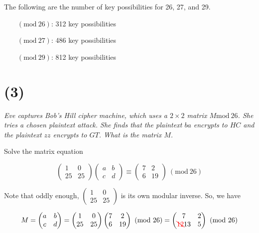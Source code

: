 \documentclass[12pt]{article}
\renewcommand{\mod}[1]{\mathrm{mod}\ #1}
\renewcommand{\pmod}[1]{\ (\mod{#1})}
\begin{document}
    The following are the number of key possibilities for 26, 27, and 29.

    \begin{itemize}
      \item[$\pmod{26}$:] 312 key possibilities
      \item[$\pmod{27}$:] 486 key possibilities
      \item[$\pmod{29}$:] 812 key possibilities
    \end{itemize}

\section*{(3)} \textit{Eve captures Bob’s Hill cipher machine, which uses a $2\times2$ matrix $M \mod{26}$. She tries a chosen plaintext attack. She finds that the plaintext $ba$ encrypts to $HC$ and the plaintext $zz$ encrypts to $GT$. What is the matrix $M$.}

    Solve the matrix equation

    $$\begin{pmatrix}1 & 0\\25 & 25\end{pmatrix}\begin{pmatrix}a & b\\c & d\end{pmatrix} \equiv \begin{pmatrix}7 & 2\\6 & 19\end{pmatrix} \pmod{26}$$

    Note that oddly enough, $\begin{pmatrix}1 & 0\\25 & 25\end{pmatrix}$ is its own modular inverse. So, we have

    $$M = \begin{pmatrix}a & b\\c & d\end{pmatrix} = \begin{pmatrix}1 & 0\\25 & 25\end{pmatrix}\begin{pmatrix}7 & 2\\6 & 19\end{pmatrix} \pmod{26} = \begin{pmatrix}7 & 2\\ {\color{red}\bcancel{12}} 13 & 5\end{pmatrix} \pmod{26}$$
\end{document}
